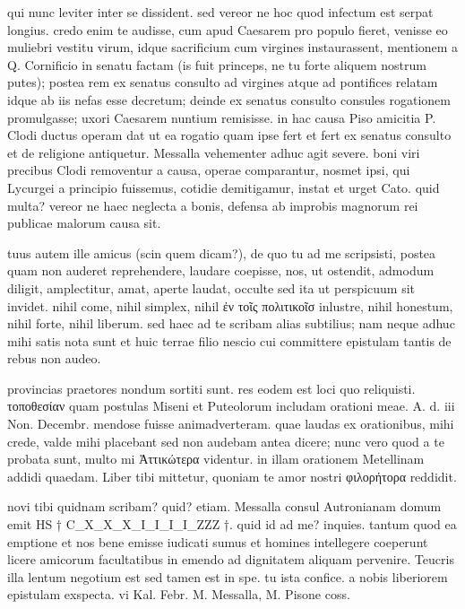  qui nunc leviter inter se dissident. sed vereor ne hoc quod infectum est serpat longius. credo enim te audisse, cum apud Caesarem pro populo fieret, venisse eo muliebri vestitu virum, idque sacrificium cum virgines instaurassent, mentionem a Q. Cornificio in senatu factam (is fuit princeps, ne tu forte aliquem nostrum putes); postea rem ex senatus consulto ad virgines atque ad pontifices relatam idque ab iis nefas esse decretum; deinde ex senatus consulto consules rogationem promulgasse; uxori Caesarem nuntium remisisse. in hac causa Piso amicitia P. Clodi ductus operam dat ut ea rogatio quam ipse fert et fert ex senatus consulto et de religione antiquetur. Messalla vehementer adhuc agit severe. boni viri precibus Clodi removentur a causa, operae comparantur, nosmet ipsi, qui Lycurgei a principio fuissemus, cotidie demitigamur, instat et urget Cato. quid multa? vereor ne haec neglecta a bonis, defensa ab improbis magnorum rei publicae malorum causa sit.

 tuus autem ille amicus (scin quem dicam?), de quo tu ad me scripsisti, postea quam non auderet reprehendere, laudare coepisse, nos, ut ostendit, admodum diligit, amplectitur, amat, aperte laudat, occulte sed ita ut perspicuum sit invidet. nihil come, nihil simplex, nihil ἐν τοῖς πολιτικοῖσ inlustre, nihil honestum, nihil forte, nihil liberum. sed haec ad te scribam alias subtilius; nam neque adhuc mihi satis nota sunt et huic terrae filio nescio cui committere epistulam tantis de rebus non audeo.

 provincias praetores nondum sortiti sunt. res eodem est loci quo reliquisti. τοποθεσίαν quam postulas Miseni et Puteolorum includam orationi meae. A. d. iii Non. Decembr. mendose fuisse animadverteram. quae laudas ex orationibus, mihi crede, valde mihi placebant sed non audebam antea dicere; nunc vero quod a te probata sunt, multo mi Ἀττικώτερα videntur. in illam orationem Metellinam addidi quaedam. Liber tibi mittetur, quoniam te amor nostri φιλορήτορα reddidit.

 novi tibi quidnam scribam? quid? etiam. Messalla consul Autronianam domum emit HS † C_X_X_X_I_I_I_I_ZZZ †. quid id ad me? inquies. tantum quod ea emptione et nos bene emisse iudicati sumus et homines intellegere coeperunt licere amicorum facultatibus in emendo ad dignitatem aliquam pervenire. Teucris illa lentum negotium est sed tamen est in spe. tu ista confice. a nobis liberiorem epistulam exspecta. vi Kal. Febr. M. Messalla, M. Pisone coss.
